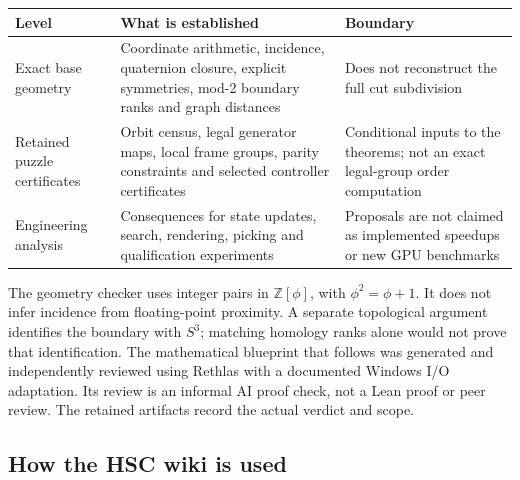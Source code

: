 \documentclass[
  10pt,
  a4paper,
]{article}
\newcounter{none} %
\begin{document}
{\def\LTcaptype{none} %
\begin{longtable}[]{@{}
  >{\raggedright\arraybackslash}p{}
  >{\raggedright\arraybackslash}p{}
  >{\raggedright\arraybackslash}p{}@{}}
\toprule\noalign{}
\begin{minipage}[b]{\linewidth}\raggedright
Level
\end{minipage} & \begin{minipage}[b]{\linewidth}\raggedright
What is established
\end{minipage} & \begin{minipage}[b]{\linewidth}\raggedright
Boundary
\end{minipage} \\
\midrule\noalign{}
\endhead
\bottomrule\noalign{}
\endlastfoot
Exact base geometry & Coordinate arithmetic, incidence, quaternion
closure, explicit symmetries, mod-2 boundary ranks and graph distances &
Does not reconstruct the full cut subdivision \\
Retained puzzle certificates & Orbit census, legal generator maps, local
frame groups, parity constraints and selected controller certificates &
Conditional inputs to the theorems; not an exact legal-group order
computation \\
Engineering analysis & Consequences for state updates, search,
rendering, picking and qualification experiments & Proposals are not
claimed as implemented speedups or new GPU benchmarks \\
\end{longtable}
}

The geometry checker uses integer pairs in \(\mathbb Z[\phi]\), with
\(\phi^2=\phi+1\). It does not infer incidence from floating-point
proximity. A separate topological argument identifies the boundary with
\(S^3\); matching homology ranks alone would not prove that
identification. The mathematical blueprint that follows was generated
and independently reviewed using Rethlas with a documented Windows I/O
adaptation. Its review is an informal AI proof check, not a Lean proof
or peer review. The retained artifacts record the actual verdict and
scope.

\subsection{How the HSC wiki is used}\label{how-the-hsc-wiki-is-used}
\end{document}
